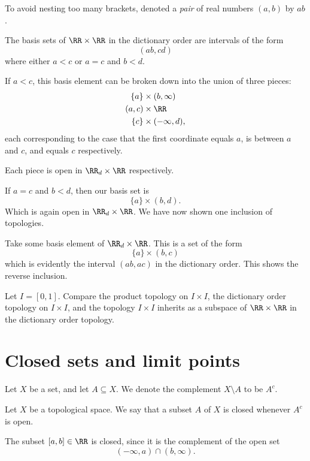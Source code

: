\documentclass{article}
\begin{document}
To avoid nesting too many brackets, denoted a \textit{pair} of real numbers $(a,b)$ by $ab$.

The basis sets of $\RR \times \RR$ in the dictionary order are intervals of the form
\[
    (ab, cd)
\]
where either $a<c$ or $a=c$ and $b<d$.

If $a < c$, this basis element can be broken down into the union of three pieces:
\begin{align*}
    \{a\} &\times (b, \infty) \\
    (a,c) &\times \RR \\
    \{c\} &\times (-\infty, d),
\end{align*}
each corresponding to the case that the first coordinate equals $a$, is between $a$ and $c$, and equals $c$ respectively.

Each piece is open in $\RR_d \times \RR$ respectively.

If $a=c$ and $b<d$, then our basis set is
\[
    \{a\} \times (b,d).
\]
Which is again open in $\RR_d \times \RR$.
We have now shown one inclusion of topologies.

Take some basis element of $\RR_d \times \RR$.
This is a set of the form 
\[
    \{a\} \times (b,c)
\]
which is evidently the interval $(ab, ac)$ in the dictionary order.
This shows the reverse inclusion.

\begin{exercise}
    Let $I = [0,1]$.
    Compare the product topology on $I \times I$, the dictionary order topology on $I \times I$, and the topology $I \times I$ inherits as a subspace of $\RR \times \RR$ in the dictionary order topology.
\end{exercise}


\section{Closed sets and limit points}

\begin{convention}
    Let $X$ be a set, and let $A \subseteq X$.
    We denote the complement $X \setminus A$ to be $A^c$.
\end{convention}

\begin{definition}
    Let $X$ be a topological space.
    We say that a subset $A$ of $X$ is closed whenever $A^c$ is open.
\end{definition}

\begin{example}
    The subset $[a,b] \in \RR$ is closed, since it is the complement of the open set 
    \[
        (-\infty, a) \cap (b, \infty).
    \]
\end{example}
\end{document}
